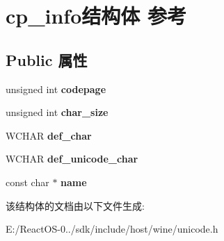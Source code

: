 \hypertarget{structcp__info}{}\section{cp\+\_\+info结构体 参考}
\label{structcp__info}
\subsection*{Public 属性}
\begin{DoxyCompactItemize}
\item 
\mbox{\label{structcp__info_a3d9de8d60c57ccf87eb1de5918fccaf4}} 
unsigned int {\bfseries codepage}
\item 
\mbox{\label{structcp__info_a03af20aad1616a5f454e9c5b85f663cf}} 
unsigned int {\bfseries char\+\_\+size}
\item 
\mbox{\label{structcp__info_a698e7c6a480a800f84ae0e9e2b644f5a}} 
W\+C\+H\+AR {\bfseries def\+\_\+char}
\item 
\mbox{\label{structcp__info_a54ca354a12ee942da8a146024f5f1b84}} 
W\+C\+H\+AR {\bfseries def\+\_\+unicode\+\_\+char}
\item 
\mbox{\label{structcp__info_aad4c18d28c8282e50950188e7bca3823}} 
const char $\ast$ {\bfseries name}
\end{DoxyCompactItemize}


该结构体的文档由以下文件生成\+:\begin{DoxyCompactItemize}
\item 
E\+:/\+React\+O\+S-\/0../sdk/include/host/wine/unicode.\+h\end{DoxyCompactItemize}
